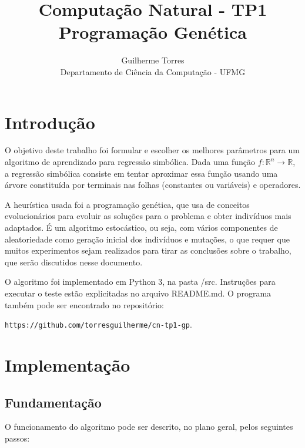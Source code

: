 \documentclass[11pt]{article}
\begin{document}
\title{Computação Natural - TP1\\Programação Genética}
\author{Guilherme Torres\\Departamento de Ciência da Computação - UFMG}
\date{}
\maketitle

\section{Introdução}

O objetivo deste trabalho foi formular e escolher os melhores parâmetros para um algoritmo de aprendizado para regressão simbólica. Dada uma função $f: \mathbb{R}^n \to \mathbb{R}$, a regressão simbólica consiste em tentar aproximar essa função usando uma árvore constituída por terminais nas folhas (constantes ou variáveis) e operadores.
	
A heurística usada foi a programação genética, que usa de conceitos evolucionários para evoluir as soluções para o problema e obter indivíduos mais adaptados. É um algoritmo estocástico, ou seja, com vários componentes de aleatoriedade como geração inicial dos indivíduos e mutações, o que requer que muitos experimentos sejam realizados para tirar as conclusões sobre o trabalho, que serão discutidos nesse documento.

O algoritmo foi implementado em Python 3, na pasta /src. Instruções para executar o teste estão explicitadas no arquivo README.md. O programa também pode ser encontrado no repositório:

\texttt{https://github.com/torresguilherme/cn-tp1-gp}.

\section{Implementação}

\subsection{Fundamentação}

O funcionamento do algoritmo pode ser descrito, no plano geral, pelos seguintes passos:
\end{document}
